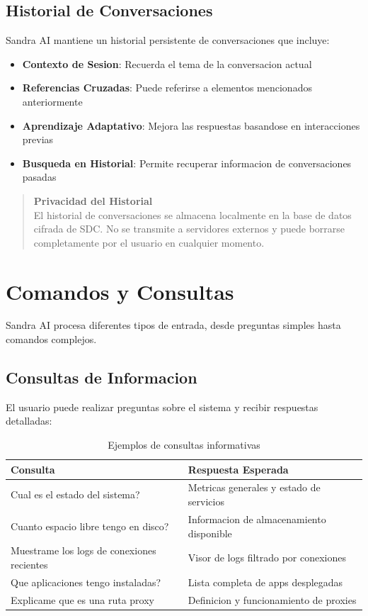\subsection{Historial de Conversaciones}

Sandra AI mantiene un historial persistente de conversaciones que incluye:

\begin{itemize}[leftmargin=*]
    \item \textbf{Contexto de Sesion}: Recuerda el tema de la conversacion actual
    \item \textbf{Referencias Cruzadas}: Puede referirse a elementos mencionados anteriormente
    \item \textbf{Aprendizaje Adaptativo}: Mejora las respuestas basandose en interacciones previas
    \item \textbf{Busqueda en Historial}: Permite recuperar informacion de conversaciones pasadas
\end{itemize}

\begin{quote}
\textbf{Privacidad del Historial}\\
El historial de conversaciones se almacena localmente en la base de datos cifrada de SDC. No se transmite a servidores externos y puede borrarse completamente por el usuario en cualquier momento.
\end{quote}

\section{Comandos y Consultas}
\label{sec:comandos-chat}

Sandra AI procesa diferentes tipos de entrada, desde preguntas simples hasta comandos complejos.

\subsection{Consultas de Informacion}

El usuario puede realizar preguntas sobre el sistema y recibir respuestas detalladas:

\begin{table}[H]
\centering
\begin{tabular}{p{8cm}p{6cm}}
\toprule
\textbf{Consulta} & \textbf{Respuesta Esperada} \\
\midrule
Cual es el estado del sistema? & Metricas generales y estado de servicios \\
\midrule
Cuanto espacio libre tengo en disco? & Informacion de almacenamiento disponible \\
\midrule
Muestrame los logs de conexiones recientes & Visor de logs filtrado por conexiones \\
\midrule
Que aplicaciones tengo instaladas? & Lista completa de apps desplegadas \\
\midrule
Explicame que es una ruta proxy & Definicion y funcionamiento de proxies \\
\bottomrule
\end{tabular}
\caption{Ejemplos de consultas informativas}
\label{tab:consultas-chat}
\end{table}

